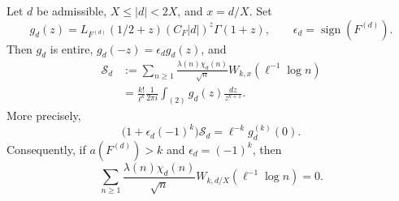 \begin{lemma}
\label{weights:vanishing}
Let \(d\) be admissible, \(X\le |d|<2X\), and \(x=d/X\). Set
\[
 g_d(z)=L_{F^{(d)}}(1/2+z)(C_F|d|)^z\Gamma(1+z),
 \qquad \epsilon_d=\operatorname{sign}(F^{(d)}).
\]
Then \(g_d\) is entire, \(g_d(-z)=\epsilon_d g_d(z)\), and
\begin{equation}
 \begin{split}
 \mathcal S_d
 &:=
 \sum_{n\ge1}\frac{\lambda(n)\chi_d(n)}{\sqrt n}
                 W_{k,x}(\ell^{-1}\log n)\\
 &=\frac{k!}{\ell^k}\frac{1}{2\pi i}
       \int_{(2)}g_d(z)\frac{dz}{z^{k+1}}.
 \end{split}
 \label{weights:completed-integral}
\end{equation}
More precisely,
\begin{equation}
 \bigl(1+\epsilon_d(-1)^k\bigr)\mathcal S_d
       =\ell^{-k}g_d^{(k)}(0).
 \label{weights:exact-derivative}
\end{equation}
Consequently, if \(a(F^{(d)})>k\) and
\(\epsilon_d=(-1)^k\), then
\begin{equation}
 \sum_{n\ge1}\frac{\lambda(n)\chi_d(n)}{\sqrt n}
                  W_{k,d/X}(\ell^{-1}\log n)=0.
 \label{weights:zero}
\end{equation}
\end{lemma}

